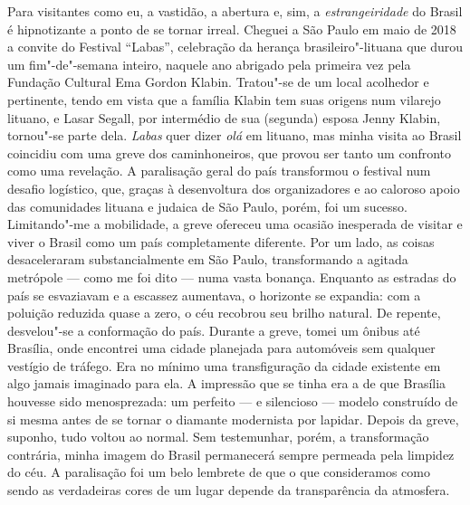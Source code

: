 Para visitantes como eu, a vastidão, a abertura e, sim, a
\textit{estrangeiridade} do Brasil é hipnotizante a ponto de se tornar irreal.
Cheguei a São Paulo em maio de 2018 a convite do Festival ``Labas'',
celebração da herança brasileiro"-lituana que durou um fim"-de"-semana
inteiro, naquele ano abrigado pela primeira vez pela Fundação Cultural
Ema Gordon Klabin. Tratou"-se de um local acolhedor e pertinente, tendo
em vista que a família Klabin tem suas origens num vilarejo lituano, e
Lasar Segall, por intermédio de sua (segunda) esposa Jenny Klabin,
tornou"-se parte dela. \textit{Labas} quer dizer \textit{olá} em lituano, mas
minha visita ao Brasil coincidiu com uma greve dos caminhoneiros, que
provou ser tanto um confronto como uma revelação. A paralisação geral do
país transformou o festival num desafio logístico, que, graças à
desenvoltura dos organizadores e ao caloroso apoio das comunidades
lituana e judaica de São Paulo, porém, foi um sucesso. Limitando"-me a
mobilidade, a greve ofereceu uma ocasião inesperada de visitar e viver o
Brasil como um país completamente diferente. Por um lado, as coisas
desaceleraram substancialmente em São Paulo, transformando a agitada
metrópole --- como me foi dito --- numa vasta bonança. Enquanto as estradas
do país se esvaziavam e a escassez aumentava, o horizonte se expandia:
com a poluição reduzida quase a zero, o céu recobrou seu brilho natural.
De repente, desvelou"-se a conformação do país. Durante a greve, tomei um
ônibus até Brasília, onde encontrei uma cidade planejada para automóveis
sem qualquer vestígio de tráfego. Era no mínimo uma transfiguração da
cidade existente em algo jamais imaginado para ela. A impressão que se
tinha era a de que Brasília houvesse sido menosprezada: um perfeito --- e
silencioso --- modelo construído de si mesma antes de se tornar o diamante
modernista por lapidar. Depois da greve, suponho, tudo voltou ao normal.
Sem testemunhar, porém, a transformação contrária, minha imagem do
Brasil permanecerá sempre permeada pela limpidez do céu. A paralisação
foi um belo lembrete de que o que consideramos como sendo as verdadeiras
cores de um lugar depende da transparência da atmosfera.

